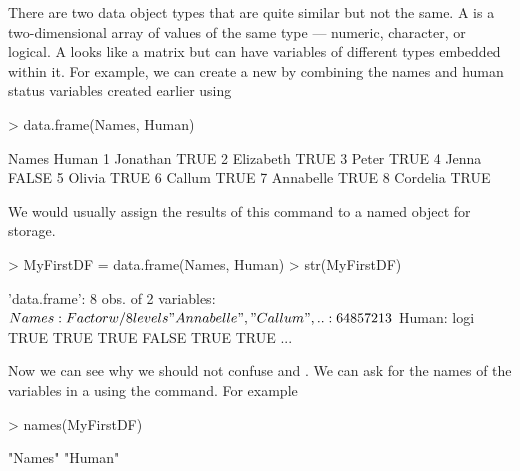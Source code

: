 There are two data object types that are quite similar but not the same. A  is a two-dimensional array of values of the same type --- numeric, character, or logical. A  looks like a matrix but can have variables of different types embedded within it. For example, we can create a new  by combining the names and human status variables created earlier using 
\begin{Schunk}
\begin{Sinput}
> data.frame(Names, Human) 
\end{Sinput}
\begin{Soutput}
      Names Human
1  Jonathan  TRUE
2 Elizabeth  TRUE
3     Peter  TRUE
4     Jenna FALSE
5    Olivia  TRUE
6    Callum  TRUE
7 Annabelle  TRUE
8  Cordelia  TRUE
\end{Soutput}
\end{Schunk}
We would usually assign the results of this command to a named object for storage. 
\begin{Schunk}
\begin{Sinput}
> MyFirstDF = data.frame(Names, Human) 
> str(MyFirstDF) 
\end{Sinput}
\begin{Soutput}
'data.frame':	8 obs. of  2 variables:
 $ Names: Factor w/ 8 levels "Annabelle","Callum",..: 6 4 8 5 7 2 1 3
 $ Human: logi  TRUE TRUE TRUE FALSE TRUE TRUE ...
\end{Soutput}
\end{Schunk}
 
Now we can see why we should not confuse  and . We can ask for the names of the variables in a  using the  command. For example 
\begin{Schunk}
\begin{Sinput}
> names(MyFirstDF) 
\end{Sinput}
\begin{Soutput}
[1] "Names" "Human"
\end{Soutput}
\end{Schunk}
 
